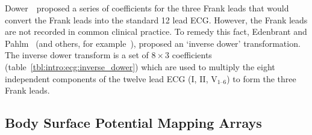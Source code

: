 Dower~\cite{Dower1980}\ proposed a series of coefficients for the three Frank
leads that would convert the Frank leads into the standard 12 lead ECG.
However, the Frank leads are not recorded in common clinical practice.
To remedy this fact, Edenbrant and Pahlm~\cite{Edenbrant1988} (and others, for
example~\cite{Uijen1988}), proposed an `inverse dower' transformation.
The inverse dower transform is a set of $8\times3$ coefficients
(table~\ref{tbl:intro:ecg:inverse_dower}) which are used to multiply the eight
independent components of the twelve lead ECG (I, II, $\text{V}_{\text{1--6}}$)
to form the three Frank leads.

\subsection{Body Surface Potential Mapping Arrays}


